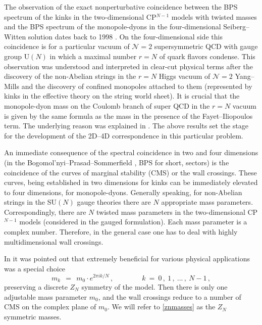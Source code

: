 \documentclass[epsfig,12pt]{article}
\def\beq{\begin{equation}}
\def\eeq{\end{equation}}
\def\beq{\begin{equation}}
\def\eeq{\end{equation}}
\begin{document}
	The observation of the exact nonperturbative coincidence between the BPS spectrum
	of the kinks in the two-dimensional CP$^{N-1}$ models with twisted masses and the BPS spectrum of the 
	monopole-dyons
	in the four-dimensional Seiberg--Witten solution 
\cite{SeibergWitten}
	dates back to 1998 
\cite{Dorey:1998yh}. On the four-dimensional side this coincidence is for a particular vacuum of ${\mathcal N}=2$
supersymmetric QCD with gauge group U$(N)$ in which a maximal number $r=N$ of quark flavors condense.
	This observation was understood and interpreted in clear-cut physical terms after the discovery of 
	the non-Abelian strings 
	\cite{1,2} in the $r=N$ Higgs vacuum of ${\mathcal N}=2$ Yang--Mills and the discovery of confined monopoles attached to them 
\cite{Shifman:2004dr,4} 
	(represented by kinks in the effective theory on the string world sheet). 
	It is crucial that the monopole-dyon mass  on the Coulomb branch of super QCD in the $r=N$ vacuum is given by the same formula  
	as the mass in the presence of  the  Fayet--Iliopoulos term.
	The underlying reason was explained in 
\cite{Shifman:2004dr,4}. 
	The above results  set the stage for the development of the 2D--4D correspondence in this particular problem.

	An immediate consequence of the spectral coincidence in two and four dimensions 
	(in the Bogomol'nyi--Prasad--Sommerfield 
\cite{BPS}, 
	BPS for short, sectors) 
	is the coincidence of the curves of marginal stability (CMS) or the  wall crossings.
	These curves, being established in two dimensions for kinks can be immediately elevated to four dimensions, for monopole-dyons. 
	Generally speaking, for non-Abelian strings in the SU$(N)$ gauge theories there are $N$ appropriate mass parameters.
	Correspondingly, there are $N$ twisted mass parameters in the two-dimensional CP$^{N-1}$ models (considered in the gauged formulation). 
	Each mass parameter is a complex number. 
	Therefore, in the general case one has to deal with highly multidimensional 
	 wall crossings.

	In \cite{Gorsky} it was pointed out that extremely beneficial for various physical applications 
	was a special choice 
\beq
\label{znmasses}
	m_k ~~=~~ m_0 \cdot e^{2 \pi i k / N}\,,\qquad\qquad k~=~0\,,~1\,,~ ...\,,~ N-1\,,
\eeq
	preserving a discrete $Z_N$ symmetry of the model. 
	Then there is only one adjustable mass parameter $m_0$,
	and the  wall crossings reduce to a number of CMS on the complex plane of $m_0$.
	We will refer to \eqref{znmasses} as the $Z_N$ symmetric masses.
\end{document}
